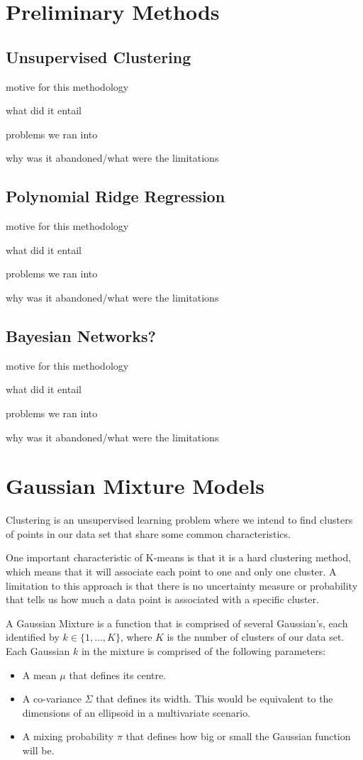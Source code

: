 \documentclass[fleqn,usenatbib]{mnras}
\begin{document}
\section{Preliminary Methods}
\subsection{Unsupervised Clustering}
motive for this methodology

what did it entail

problems we ran into

why was it abandoned/what were the limitations
\subsection{Polynomial Ridge Regression}
motive for this methodology

what did it entail

problems we ran into

why was it abandoned/what were the limitations
\subsection{Bayesian Networks?}
motive for this methodology

what did it entail

problems we ran into

why was it abandoned/what were the limitations

\section{Gaussian Mixture Models}
Clustering is an unsupervised learning problem where we intend to find clusters of points in our data set that share some common characteristics.

One important characteristic of K-means is that it is a hard clustering method, which means that it will associate each point to one and only one cluster.
A limitation to this approach is that there is no uncertainty measure or probability that tells us how much a data point is associated with a specific cluster.

A Gaussian Mixture is a function that is comprised of several Gaussian's, each identified by $k \in \{1,\dots, K\}$, where $K$ is the number of clusters of our data set. Each Gaussian $k$ in the mixture is comprised of the following parameters:

\begin{itemize}
    \item A mean $\mu$ that defines its centre.
    \item A co-variance $\Sigma$ that defines its width. This would be equivalent to the dimensions of an ellipsoid in a multivariate scenario.
    \item A mixing probability $\pi$ that defines how big or small the Gaussian function will be.
\end{itemize}
\end{document}
